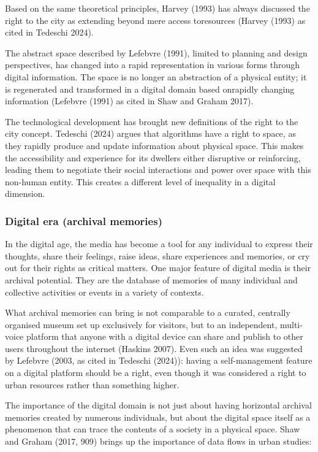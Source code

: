 \documentclass[
  letterpaper,
  DIV=11,
  numbers=noendperiod]{scrartcl}
\begin{document}
Based on the same theoretical principles, Harvey (1993) has always
discussed the right to the city as extending beyond mere access
toresources (Harvey (1993) as cited in Tedeschi 2024).

The abstract space described by Lefebvre (1991), limited to planning and
design perspectives, has changed into a rapid representation in various
forms through digital information. The space is no longer an abstraction
of a physical entity; it is regenerated and transformed in a digital
domain based onrapidly changing information (Lefebvre (1991) as cited in
Shaw and Graham 2017).

The technological development has brought new definitions of the right
to the city concept. Tedeschi (2024) argues that algorithms have a right
to space, as they rapidly produce and update information about physical
space. This makes the accessibility and experience for its dwellers
either disruptive or reinforcing, leading them to negotiate their social
interactions and power over space with this non-human entity. This
creates a different level of inequality in a digital dimension.

\subsubsection{Digital era (archival
memories)}\label{digital-era-archival-memories}

In the digital age, the media has become a tool for any individual to
express their thoughts, share their feelings, raise ideas, share
experiences and memories, or cry out for their rights as critical
matters. One major feature of digital media is their archival potential.
They are the database of memories of many individual and collective
activities or events in a variety of contexts.

What archival memories can bring is not comparable to a curated,
centrally organised museum set up exclusively for visitors, but to an
independent, multi-voice platform that anyone with a digital device can
share and publish to other users throughout the internet (Haskins 2007).
Even such an idea was suggested by Lefebvre (2003, as cited in Tedeschi
(2024)): having a self-management feature on a digital platform should
be a right, even though it was considered a right to urban resources
rather than something higher.

The importance of the digital domain is not just about having horizontal
archival memories created by numerous individuals, but about the digital
space itself as a phenomenon that can trace the contents of a society in
a physical space. Shaw and Graham (2017, 909) brings up the importance
of data flows in urban studies:
\end{document}

